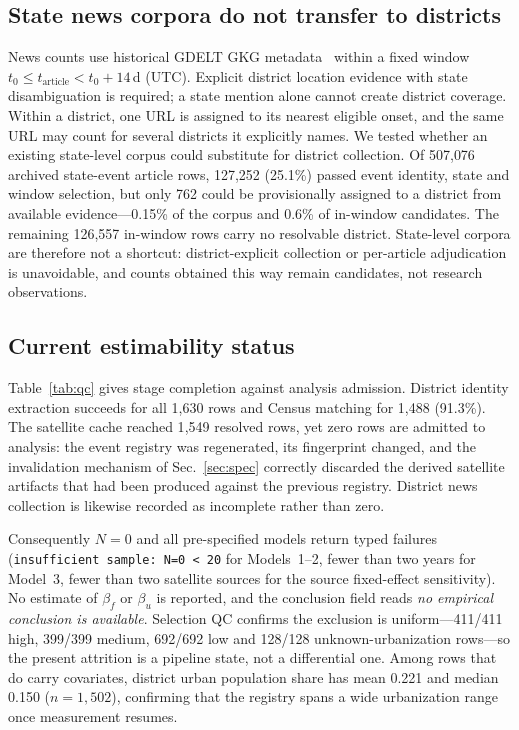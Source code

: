 \documentclass[conference]{IEEEtran}
\begin{document}
\subsection{State news corpora do not transfer to districts}\label{sec:news}
News counts use historical GDELT GKG metadata~\cite{leetaru2013} within a fixed
window $t_0 \le t_{\text{article}} < t_0 + 14$\,d (UTC). Explicit district
location evidence with state disambiguation is required; a state mention alone
cannot create district coverage. Within a district, one URL is assigned to its
nearest eligible onset, and the same URL may count for several districts it
explicitly names. We tested whether an existing state-level corpus could
substitute for district collection. Of 507{,}076 archived state-event article rows, 127{,}252 (25.1\%)
passed event identity, state and window selection, but only 762 could be
provisionally assigned to a district from available evidence---0.15\% of the
corpus and 0.6\% of in-window candidates. The remaining 126{,}557 in-window rows
carry no resolvable district. State-level corpora are therefore not a shortcut:
district-explicit collection or per-article adjudication is unavoidable, and
counts obtained this way remain candidates, not research observations.

\subsection{Current estimability status}\label{sec:status}
Table~\ref{tab:qc} gives stage completion against analysis admission. District
identity extraction succeeds for all 1{,}630 rows and Census matching for 1{,}488
(91.3\%). The satellite cache reached 1{,}549 resolved rows, yet zero rows are
admitted to analysis: the event registry was regenerated, its fingerprint
changed, and the invalidation mechanism of Sec.~\ref{sec:spec} correctly
discarded the derived satellite artifacts that had been produced against the
previous registry. District news collection is likewise recorded as incomplete
rather than zero.

Consequently $N=0$ and all pre-specified models return typed failures
(\texttt{insufficient sample: N=0 < 20} for Models~1--2, fewer than two years
for Model~3, fewer than two satellite sources for the source fixed-effect
sensitivity). No estimate of $\beta_f$ or $\beta_u$ is reported, and the
conclusion field reads \emph{no empirical conclusion is available}. Selection
QC confirms the exclusion is uniform---411/411 high, 399/399 medium, 692/692 low
and 128/128 unknown-urbanization rows---so the present attrition is a pipeline
state, not a differential one. Among rows that do carry covariates, district
urban population share has mean 0.221 and median 0.150 ($n=1{,}502$),
confirming that the registry spans a wide urbanization range once measurement
resumes.
\end{document}
